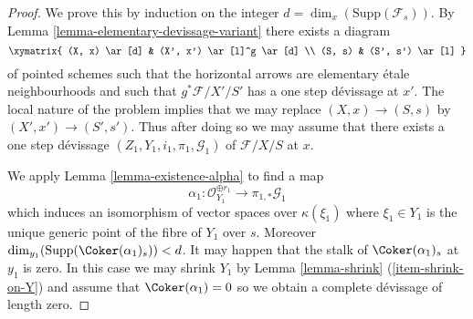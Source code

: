 \begin{proof}
We prove this by induction on the integer
$d = \dim_x(\text{Supp}(\mathcal{F}_s))$.
By
Lemma \ref{lemma-elementary-devissage-variant}
there exists a diagram
$$
\xymatrix{
(X, x) \ar[d] & (X', x') \ar[l]^g \ar[d] \\
(S, s) & (S', s') \ar[l]
}
$$
of pointed schemes such that the horizontal
arrows are elementary \'etale neighbourhoods
and such that $g^*\mathcal{F}/X'/S'$ has a one step d\'evissage at $x'$.
The local nature of the problem implies that we may replace
$(X, x) \to (S, s)$ by $(X', x') \to (S', s')$. Thus after doing so
we may assume that there exists a one step d\'evissage
$(Z_1, Y_1, i_1, \pi_1, \mathcal{G}_1)$ of $\mathcal{F}/X/S$ at $x$.

\medskip\noindent
We apply
Lemma \ref{lemma-existence-alpha}
to find a map
$$
\alpha_1 :
\mathcal{O}_{Y_1}^{\oplus r_1}
\longrightarrow
\pi_{1, *}\mathcal{G}_1
$$
which induces an isomorphism of vector spaces over $\kappa(\xi_1)$
where $\xi_1 \in Y_1$ is the unique generic point of the fibre of
$Y_1$ over $s$. Moreover
$\dim_{y_1}(\text{Supp}(\Coker(\alpha_1)_s)) < d$.
It may happen that the stalk of $\Coker(\alpha_1)_s$
at $y_1$ is zero. In this case we may shrink $Y_1$ by
Lemma \ref{lemma-shrink} (\ref{item-shrink-on-Y})
and assume that $\Coker(\alpha_1) = 0$ so we obtain a
complete d\'evissage of length zero.


\end{proof}
